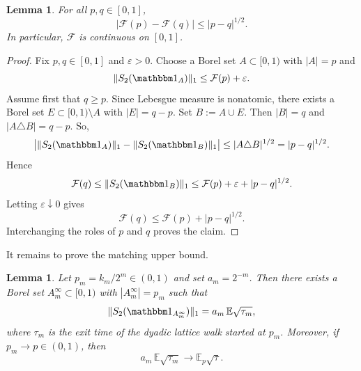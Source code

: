 \documentclass[11pt]{amsart}
\newtheorem{lemma}[theorem]{Lemma}
\theoremstyle{definition}
\renewcommand{\1}{{\mathbbm{1}}}
\begin{document}
\begin{lemma}\label{lem:F-continuity-S2}
For all $p,q\in[0,1]$,
\[
|\mathcal{F}(p)-\mathcal{F}(q)|\le |p-q|^{1/2}.
\]
In particular, $\mathcal{F}$ is continuous on $[0,1]$.
\end{lemma}

\begin{proof}
Fix $p,q\in[0,1]$ and $\varepsilon>0$. Choose a Borel set $A\subset{[0,1)}$ with $|A|=p$ and
\[
\|S_2(\mathbbm 1_A)\|_1\le \mathcal{F}(p)+\varepsilon.
\]
Assume first that $q\ge p$. Since Lebesgue measure is nonatomic, there exists a Borel set $E\subset{[0,1)}\setminus A$ with $|E|=q-p$. Set $B:=A\cup E$. Then $|B|=q$ and
$
|A\triangle B|=q-p.
$
So,
\[
\big|\|S_2(\mathbbm 1_A)\|_1-\|S_2(\mathbbm 1_B)\|_1\big|
\le |A\triangle B|^{1/2}
=
|p-q|^{1/2}.
\]
Hence
\[
\mathcal{F}(q)\le \|S_2(\mathbbm 1_B)\|_1\le \mathcal{F}(p)+\varepsilon+|p-q|^{1/2}.
\]
Letting $\varepsilon\downarrow0$ gives
\[
\mathcal{F}(q)\le \mathcal{F}(p)+|p-q|^{1/2}.
\]
Interchanging the roles of $p$ and $q$ proves the claim.
\end{proof}

It remains to prove the matching upper bound.
\begin{lemma}\label{lem:dyadic-mass-upper-S2}
Let $p_m=k_m/2^m\in(0,1)$ and set $a_m=2^{-m}$. Then there exists a Borel set
$A_m^\infty\subset{[0,1)}$ with $|A_m^\infty|=p_m$ such that
\[
\|S_2(\mathbbm 1_{A_m^\infty})\|_1
=
a_m\,\mathbb E\sqrt{\tau_m},
\]
where $\tau_m$ is the exit time of the dyadic lattice walk started at $p_m$. 
Moreover, if $p_m\to p\in(0,1)$, then
\[
a_m\,\mathbb E\sqrt{\tau_m}\to \mathbb E_p\sqrt{\tau}.
\]
\end{lemma}
\end{document}
